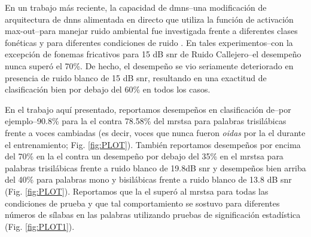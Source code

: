 En un trabajo más reciente, la capacidad de \glspl{dmn}--una modificación de arquitectura de \glspl{dnn} alimentada en directo que utiliza la función de activación max-out--para manejar ruido ambiental fue investigada frente a diferentes clases fonéticas y para diferentes condiciones de ruido \cite{silos_2016}. En tales experimentos--con la excepción de fonemas fricativos para 15 dB \gls{snr} de Ruido Callejero--el desempeño nunca superó el 70\%. De hecho, el desempeño se vio seriamente deteriorado en presencia de ruido blanco de 15 dB \gls{snr}, resultando en una exactitud de clasificación bien por debajo del 60\% en todos los casos.

En el trabajo aquí presentado, reportamos desempeños en clasificación de--por ejemplo--90.8\% para la \gls{el} contra 78.58\% del \gls{mrstsa} para palabras trisilábicas frente a voces cambiadas (es decir, voces que nunca fueron \emph{oidas} por la \gls{el} durante el entrenamiento; Fig. \ref{fig:PLOT}). También reportamos desempeños por encima del 70\% en la \gls{el} contra un desempeño por debajo del 35\% en el \gls{mrstsa} para palabras trisilábicas frente a ruido blanco de 19.8dB \gls{snr} y desempeños bien arriba del 40\% para palabras mono y bisilábicas frente a ruido blanco de 13.8 dB \gls{snr} (Fig. \ref{fig:PLOT}). Reportamos que la \gls{el} superó al \gls{mrstsa} para todas las condiciones de prueba y que tal comportamiento se sostuvo para diferentes números de sílabas en las palabras utilizando pruebas de significación estadística (Fig. \ref{fig:PLOT1}).

